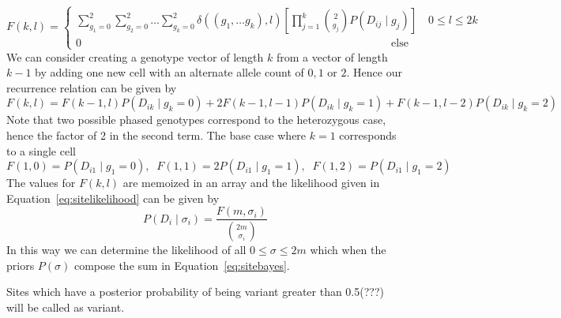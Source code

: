 \documentclass[../../main.tex]{subfiles}
\begin{document}
\begin{equation}
F(k,l) = \begin{cases} \sum_{g_1=0}^2\sum_{g_2=0}^2\dots\sum_{g_k=0}^2 \delta((g_1,\dots g_k),l)\left[\prod_{j=1}^{k}\binom{2}{g_j}P(D_{ij}\mid g_{j})\right] \quad 0\leq l \leq 2k \\
0 \qquad\qquad\qquad\qquad\qquad\qquad\qquad\qquad\qquad\qquad\qquad\qquad\qquad\qquad \text{else} \end{cases}
\end{equation}
We can consider creating a genotype vector of length $k$ from a vector of length $k-1$ by adding one new cell with an alternate allele count of $0,1$ or $2$. Hence our recurrence relation can be given by
\begin{equation}
F(k,l) = F(k-1,l)P(D_{ik}\mid g_k = 0) + 2F(k-1,l-1)P(D_{ik}\mid g_k = 1) + F(k-1,l-2)P(D_{ik}\mid g_k = 2)
\end{equation}
Note that two possible phased genotypes correspond to the heterozygous case, hence the factor of 2 in the second term. The base case where $k=1$ corresponds to a single cell
\begin{equation*}
F(1,0) = P(D_{i1}\mid g_1 = 0),\;\; F(1,1) = 2P(D_{i1}\mid g_1=1),\;\; F(1,2) = P(D_{i1}\mid g_1 = 2)
\end{equation*}
The values for $F(k,l)$ are memoized in an array and the likelihood given in Equation~\ref{eq:sitelikelihood} can be given by
\begin{equation}
P(D_i\mid \sigma_i)=\frac{F(m,\sigma_i)}{\binom{2m}{\sigma_i}}
\end{equation}
In this way we can determine the likelihood of all $0\leq \sigma\leq 2m$ which when the priors $P(\sigma)$ compose the sum in Equation~\eqref{eq:sitebayes}.

Sites which have a posterior probability of being variant greater than 0.5(???) will be called as variant.
\end{document}
